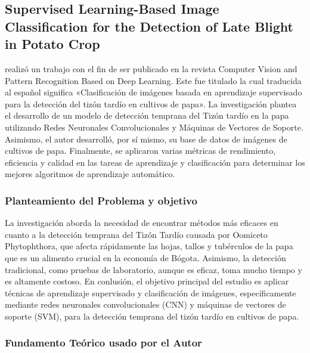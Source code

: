 

\subsection{Supervised Learning-Based Image Classification for the Detection of Late Blight in Potato Crop \citep*{antecedente3}}

\citeauthor{antecedente3} realizó un trabajo con el fin de ser publicado en la revista Computer Vision and Pattern Recognition Based on Deep Learning. Este fue titulado  la cual traducida al español significa  «Clasificación de imágenes basada en aprendizaje supervisado para la detección del tizón tardío en cultivos de papa». La investigación plantea el desarrollo de un modelo de detección temprana del Tizón tardío en la papa utilizando Redes Neuronales Convolucionales y Máquinas de Vectores de Soporte. Asimismo, el autor desarrolló, por sí mismo, su base de datos de imágenes de cultivos de papa. Finalmente, se aplicaron varias métricas de rendimiento, eficiencia y calidad en las tareas de aprendizaje y clasificación para determinar los mejores algoritmos de aprendizaje automático.

\subsubsection{Planteamiento del Problema y objetivo }

La investigación aborda la necesidad de encontrar métodos más eficaces en cuanto a la detección temprana del Tizón Tardío causada por Oomiceto Phytophthora, que afecta rápidamente las hojas, tallos y tubérculos de la papa que es un alimento crucial en la economía de Bógota. Asimismo, la detección tradicional, como pruebas de laboratorio, aunque es eficaz, toma mucho tiempo y es altamente costoso. En conlusión, el objetivo principal del estudio es aplicar técnicas de aprendizaje supervisado y clasificación de imágenes, específicamente mediante redes neuronales convolucionales (CNN) y máquinas de vectores de soporte (SVM), para la detección temprana del tizón tardío en cultivos de papa.

\subsubsection{Fundamento Teórico usado por el Autor}


